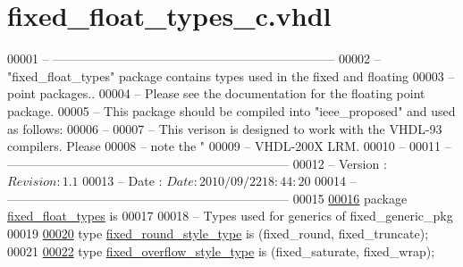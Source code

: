 \hypertarget{fixed__float__types__c_8vhdl_source}{}\section{fixed\+\_\+float\+\_\+types\+\_\+c.\+vhdl}

\begin{DoxyCode}
00001 \textcolor{keyword}{-- --------------------------------------------------------------------}
00002 \textcolor{keyword}{-- "fixed\_float\_types" package contains types used in the fixed and floating}
00003 \textcolor{keyword}{-- point packages..}
00004 \textcolor{keyword}{-- Please see the documentation for the floating point package.}
00005 \textcolor{keyword}{-- This package should be compiled into "ieee\_proposed" and used as follows:}
00006 \textcolor{keyword}{--}
00007 \textcolor{keyword}{--  This verison is designed to work with the VHDL-93 compilers.  Please}
00008 \textcolor{keyword}{--  note the "%
00009 \textcolor{keyword}{--  VHDL-200X LRM.}
00010 \textcolor{keyword}{--}
00011 \textcolor{keyword}{-- --------------------------------------------------------------------}
00012 \textcolor{keyword}{-- Version    : $Revision: 1.1 $}
00013 \textcolor{keyword}{-- Date       : $Date: 2010/09/22 18:44:20 $}
00014 \textcolor{keyword}{-- --------------------------------------------------------------------}
00015 
\hypertarget{fixed__float__types__c_8vhdl_source_l00016}{}\hyperlink{namespacefixed__float__types}{00016} \textcolor{keywordflow}{package }\hyperlink{classfixed__float__types}{fixed\_float\_types} \textcolor{keywordflow}{is}
00017 
00018 \textcolor{keyword}{  -- Types used for generics of fixed\_generic\_pkg}
00019   
\hypertarget{fixed__float__types__c_8vhdl_source_l00020}{}\hyperlink{classfixed__float__types_a531b370a8acfecdccebf696cf0d2d971}{00020}   \textcolor{keywordflow}{type} \textcolor{vhdlchar}{\hyperlink{classfixed__float__types_a531b370a8acfecdccebf696cf0d2d971}{fixed\_round\_style\_type}} \textcolor{keywordflow}{is} \textcolor{vhdlchar}{(}\textcolor{vhdlchar}{fixed\_round}\textcolor{vhdlchar}{,} \textcolor{vhdlchar}{fixed\_truncate}\textcolor{vhdlchar}{)};
00021   
\hypertarget{fixed__float__types__c_8vhdl_source_l00022}{}\hyperlink{classfixed__float__types_a8a8b6b0022e693377949251b05ac846a}{00022}   \textcolor{keywordflow}{type} \textcolor{vhdlchar}{\hyperlink{classfixed__float__types_a8a8b6b0022e693377949251b05ac846a}{fixed\_overflow\_style\_type}} \textcolor{keywordflow}{is} \textcolor{vhdlchar}{(}\textcolor{vhdlchar}{fixed\_saturate}\textcolor{vhdlchar}{,} \textcolor{vhdlchar}{fixed\_wrap}\textcolor{vhdlchar}{)};
}
\end{DoxyCode}
